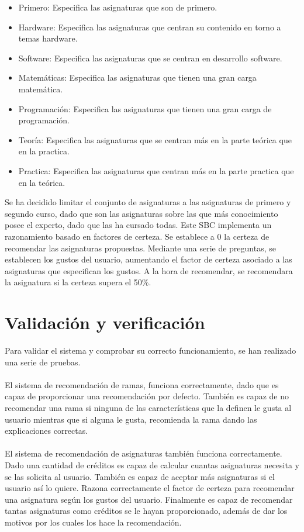 \begin{itemize}
   \item Primero: Especifica las asignaturas que son de primero.
   \item Hardware: Especifica las asignaturas que centran su contenido en torno a temas hardware.
   \item Software: Especifica las asignaturas que se centran en desarrollo software.
   \item Matemáticas: Especifica las asignaturas que tienen una gran carga matemática.
   \item Programación: Especifica las asignaturas que tienen una gran carga de programación.
   \item Teoría: Especifica las asignaturas que se centran más en la parte teórica que en la practica.
   \item Practica: Especifica las asignaturas que centran más en la parte practica que en la teórica.
\end{itemize}

Se ha decidido limitar el conjunto de asignaturas a las asignaturas de primero y segundo curso, dado que son las asignaturas sobre las que más conocimiento posee el experto, dado que las ha cursado todas.
Este SBC implementa un razonamiento basado en factores de certeza. Se establece a 0 la certeza de recomendar las asignaturas propuestas. Mediante una serie de preguntas, se establecen los gustos del usuario, aumentando el factor de certeza asociado a las asignaturas que especifican los gustos. A la hora de recomendar, se recomendara la asignatura si la certeza supera el 50\%.

\section{Validación y verificación}
Para validar el sistema y comprobar su correcto funcionamiento, se han realizado una serie de pruebas.
\\\\
El sistema de recomendación de ramas, funciona correctamente, dado que es capaz de proporcionar una recomendación por defecto. También es capaz de no recomendar una rama si ninguna de las características que la definen le gusta al usuario mientras que si alguna le gusta, recomienda la rama dando las explicaciones correctas.
\\\\
El sistema de recomendación de asignaturas también funciona correctamente. Dado una cantidad de créditos es capaz de calcular cuantas asignaturas necesita y se las solicita al usuario. También es capaz de aceptar más asignaturas si el usuario así lo quiere. Razona correctamente el factor de certeza para recomendar una asignatura según los gustos del usuario. Finalmente es capaz de recomendar tantas asignaturas como créditos se le hayan proporcionado, además de dar los motivos por los cuales los hace la recomendación.

